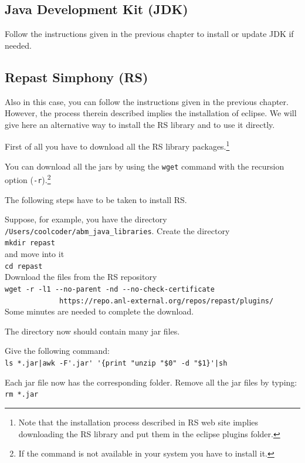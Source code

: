\documentclass{book}
\begin{document}
\subsection{Java Development Kit (JDK)}
Follow the instructions given in the previous chapter to install or update JDK if needed. 
\subsection{Repast Simphony (RS)}
Also in this case, you can follow the instructions given in the previous chapter. However, the process therein described implies the installation of eclipse. We will give here an alternative way to install the RS library and to use it directly.

First of all you have to download all the RS library packages.\footnote{Note that the installation process described in RS web site implies downloading the RS library and put them in the eclipse plugins folder.}

You can download all the jars by using the \verb+wget+ command with the recursion option (\verb+-r+).\footnote{If the command is not available in your system you have to install it.}

The following steps have to be taken to install RS.

Suppose, for example, you have the directory \verb+/Users/coolcoder/abm_java_libraries+. Create the directory\\
\verb+mkdir repast+\\
and move into it\\
\verb+cd repast+\\

Download the files from the RS repository\\
\verb+wget -r -l1 --no-parent -nd --no-check-certificate +\\
\verb+             https://repo.anl-external.org/repos/repast/plugins/+\\

Some minutes are needed to complete the download.%

The directory now should contain many jar files.

Give the following command:\\
\verb+ls *.jar|awk -F'.jar' '{print "unzip "$0" -d "$1}'|sh+

Each jar file now has the corresponding folder.
Remove all the jar files by typing:\\
\verb+rm *.jar+
\end{document}
